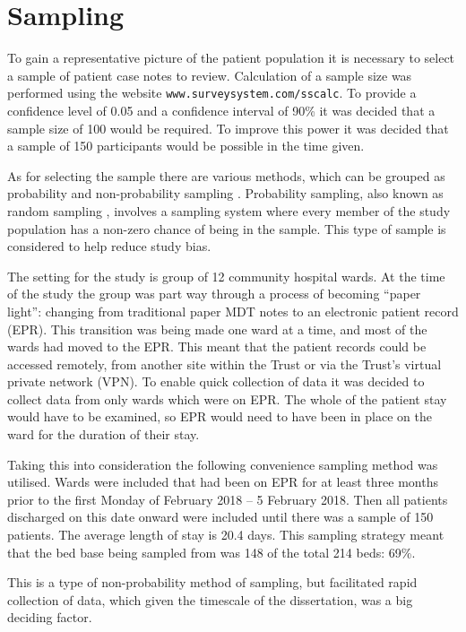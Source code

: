 \documentclass
[
	12pt,
	a4paper,
	oneside,
]{report}
\begin{document}
\section{Sampling}

To gain a representative picture of the patient population it is necessary
to select a sample of patient case notes to review. Calculation of a sample size 
was performed using the website \texttt{www.surveysystem.com/sscalc}. 
To provide a confidence
level of 0.05 and a confidence interval of 90\% it was decided that a sample 
size of 100 would be required. To improve this power it was decided that a sample
of 150 participants would be possible in the time given.

As for selecting the sample there are various methods, which can be grouped as 
probability and non-probability sampling \parencite{parahoo:14}. Probability 
sampling, also known as random sampling \parencite{biggam:15}, involves a 
sampling system where every
member of the study population has a non-zero chance of being in the sample.
This type of sample is considered to help reduce study bias.

The setting for the study is group of 12 
community hospital wards. At the time of the study the group was part way 
through a process of becoming ``paper light'': changing from traditional paper
MDT notes to an electronic patient record (EPR). This transition was being made
one ward at a time, and most of the wards had moved to the EPR. This meant that 
the patient records could be accessed remotely, from another site within the 
Trust or via the Trust's virtual private network (VPN). To enable quick 
collection of data it was decided to collect data from only wards which were on 
EPR. The whole of the patient stay would have to be examined, so EPR would need 
to have been in place on the ward for the duration of their stay.

Taking this into consideration the following convenience sampling method was 
utilised. Wards were included that had been on EPR for at least three months
prior to the first Monday of February 2018 -- 5 February 2018. Then all patients
discharged on this date onward were included until there was a sample of 150
patients. The average length of stay is 20.4 days. This sampling strategy 
meant that the bed base being sampled from was 148 of the total 214 beds: 69\%.

This is a type of non-probability method of sampling, but facilitated rapid
collection of data, which given the timescale of the dissertation, was a big
deciding factor.
\end{document}
